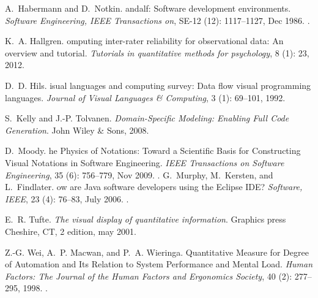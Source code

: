 \documentclass[10pt]{sigplanconf}
\begin{document}
\begin{thebibliography}{15}
A.~{H}abermann and D.~{N}otkin.
andalf: {S}oftware development environments.
\newblock \emph{Software Engineering, IEEE Transactions on}, SE-12
  (12): 1117--1127, Dec 1986.
\newblock {}.

K.~A. {H}allgren.
omputing inter-rater reliability for observational data: {A}n
  overview and tutorial.
\newblock \emph{Tutorials in quantitative methods for psychology}, 8
  (1): 23, 2012.

D.~D. {H}ils.
isual languages and computing survey: {D}ata flow visual
  programming languages.
\newblock \emph{Journal of Visual Languages \& Computing}, 3
  (1): 69--101, 1992.

S.~{K}elly and J.-P. {T}olvanen.
\newblock \emph{{D}omain-{S}pecific {M}odeling: {E}nabling {F}ull {C}ode
  {G}eneration}.
\newblock John Wiley \& Sons, 2008.

D.~{M}oody.
he {P}hysics of {N}otations: {T}oward a {S}cientific {B}asis for
  {C}onstructing {V}isual {N}otations in {S}oftware {E}ngineering.
\newblock \emph{IEEE Transactions on Software Engineering}, 35
  (6): 756--779, Nov 2009.
\newblock {}.
\vfill\eject
{}
G.~{M}urphy, M.~{K}ersten, and L.~{F}indlater.
ow are {J}ava software developers using the {Eclipse IDE}?
\newblock \emph{Software, IEEE}, 23 (4): 76--83, July 2006.
\newblock {}.

E.~R. {T}ufte.
\newblock \emph{{T}he visual display of quantitative information}.
\newblock Graphics press Cheshire, CT, 2 edition, may 2001.

Z.-G. {W}ei, A.~P. {M}acwan, and P.~A. {W}ieringa.
 {Q}uantitative {M}easure for {D}egree of {A}utomation and {I}ts
  {R}elation to {S}ystem {P}erformance and {M}ental {L}oad.
\newblock \emph{Human Factors: The Journal of the Human Factors and Ergonomics
  Society}, 40 (2): 277--295, 1998.
\newblock {}.

\end{thebibliography}
\end{document}
